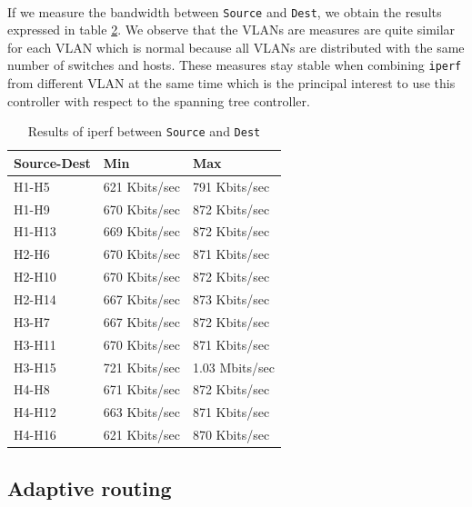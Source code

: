\documentclass[a4paper, 11pt, oneside]{article}
\begin{document}
\begin{table}[H]
\paragraph{}If we measure the bandwidth between \texttt{Source} and \texttt{Dest}, we obtain the results expressed in table \ref{table:VLANs_bw}. We observe that the VLANs are measures are quite similar for each VLAN which is normal because all VLANs are distributed with the same number of switches and hosts. These measures stay stable when combining \texttt{iperf} from different VLAN at the same time which is the principal interest to use this controller with respect to the spanning tree controller.
\begin{table}[H]
    \centering
    \begin{tabular}{|l|l|l|}
    \hline
    \textbf{Source-Dest} & \textbf{Min}  & \textbf{Max}   \\ \hline
    H1-H5                & 621 Kbits/sec & 791 Kbits/sec  \\ \hline
    H1-H9                & 670 Kbits/sec & 872 Kbits/sec  \\ \hline
    H1-H13               & 669 Kbits/sec & 872 Kbits/sec  \\ \hline
    H2-H6                & 670 Kbits/sec & 871 Kbits/sec  \\ \hline
    H2-H10               & 670 Kbits/sec & 872 Kbits/sec  \\ \hline
    H2-H14               & 667 Kbits/sec & 873 Kbits/sec  \\ \hline
    H3-H7                & 667 Kbits/sec & 872 Kbits/sec  \\ \hline
    H3-H11               & 670 Kbits/sec & 871 Kbits/sec  \\ \hline
    H3-H15               & 721 Kbits/sec & 1.03 Mbits/sec \\ \hline
    H4-H8                & 671 Kbits/sec & 872 Kbits/sec  \\ \hline
    H4-H12               & 663 Kbits/sec & 871 Kbits/sec  \\ \hline
    H4-H16               & 621 Kbits/sec & 870 Kbits/sec  \\ \hline
    \end{tabular}
    \caption{Results of iperf between \texttt{Source} and \texttt{Dest}}
    \label{table:VLANs_bw}
    \end{table}
\subsection{Adaptive routing}

\end{table}
\end{document}
